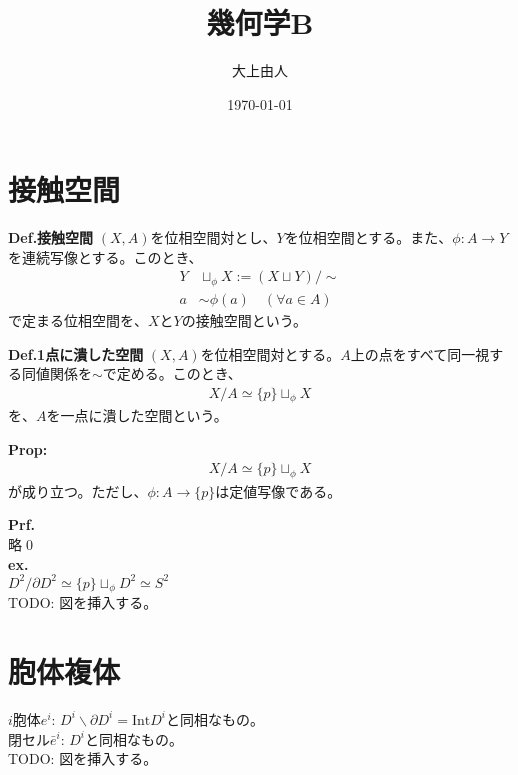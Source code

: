 \documentclass[a4paper,11pt]{jsarticle}
\numberwithin{equation}{section}
\begin{document}
\title{幾何学B}
\author{大上由人}
\date{\today}
\maketitle

\section{接触空間}
\begin{itembox}[l]{\textbf{Def.接触空間}}
    $(X,A)$を位相空間対とし、$Y$を位相空間とする。また、$\phi: A \to Y$を連続写像とする。このとき、
    \begin{align}
        Y &\sqcup_{\phi} X := (X \sqcup Y) / \sim\\
        a & \sim \phi(a) \quad (\forall a \in A)
    \end{align}
    で定まる位相空間を、$X$と$Y$の接触空間という。
\end{itembox}

\begin{itembox}[l]{\textbf{Def.1点に潰した空間}}
    $(X,A)$を位相空間対とする。$A$上の点をすべて同一視する同値関係を$\sim$で定める。このとき、
    \begin{align}
        X/A \simeq \{p\}\sqcup_{\phi} X
    \end{align}
    を、$A$を一点に潰した空間という。
\end{itembox}

\begin{itembox}[l]{\textbf{Prop:}}
    \begin{align}
        X/A \simeq \{p\}\sqcup_{\phi} X
    \end{align}
    が成り立つ。ただし、$\phi: A \to \{p\}$は定値写像である。
\end{itembox}
\textbf{Prf.}\\
略\qed\\

\textbf{ex.}\\
$D^2/\partial D^2 \simeq \{p\}\sqcup_{\phi} D^2 \simeq S^2$\\
TODO: 図を挿入する。

\section{胞体複体}
$i$胞体$e^i$: $D^i \backslash \partial D^i = \text{Int}D^i$と同相なもの。\\
閉セル$\bar{e}^i$: $D^i$と同相なもの。\\
TODO: 図を挿入する。
\end{document}
